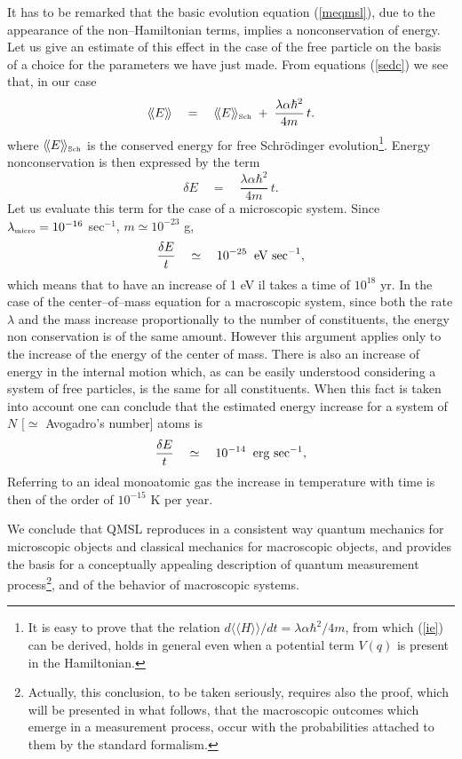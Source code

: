 \documentclass[10pt,a4paper]{article}
\newcommand{\llangle}{\langle\!\langle}
\newcommand{\rrangle}{\rangle\!\rangle}
\begin{document}
It has to be remarked that the basic evolution equation
(\ref{meqmsl}), due to the appearance of the non--Hamiltonian
terms, implies a nonconservation of energy. Let us give an
estimate of this effect in the case of the free particle on the
basis of a choice for the parameters we have just made. From
equations (\ref{sedc}) we see that, in our case
\begin{equation} \label{ie}
\llangle E \rrangle \quad = \quad \llangle E
\rrangle_{\makebox{\tiny Sch}} \; + \;
\frac{\lambda\alpha\hbar^{2}}{4m}\, t.
\end{equation}
where $\llangle E \rrangle_{\makebox{\tiny Sch}}$ is the conserved
energy for free Schr\"odinger evolution\footnote{It is easy to
prove that the relation $d\llangle H \rrangle/dt = \lambda \alpha
\hbar^{2}/4m$, from which (\ref{ie}) can be derived, holds in
general even when a potential term $V(q)$ is present in the
Hamiltonian.}. Energy nonconservation is then expressed by the
term
\begin{equation}
\delta E \quad = \quad \frac{\lambda\alpha\hbar^{2}}{4m}\, t.
\end{equation}
Let us evaluate this term for the case of a microscopic system.
Since $\lambda_{\makebox{\tiny micro}} = 10^{-16}$ sec$^{-1}$, $m
\simeq 10^{-23}$ g,
\begin{equation}
\frac{\delta E}{t} \quad \simeq \quad 10^{-25} \;\; \makebox{eV
sec}^{-1},
\end{equation}
which means that to have an increase of 1 eV il takes a time of
$10^{18}$ yr. In the case of the center--of--mass equation for a
macroscopic system, since both the rate $\lambda$ and the mass
increase proportionally to the number of constituents, the energy
non conservation is of the same amount. However this argument
applies only to the increase of the energy of the center of mass.
There is also an increase of energy in the internal motion which,
as can be easily understood considering a system of free
particles, is the same for all constituents. When this fact is
taken into account one can conclude that the estimated energy
increase for a system of $N$  $[\simeq$ Avogadro's number] atoms is
\begin{equation}
\frac{\delta E}{t} \quad \simeq \quad 10^{-14} \;\; \makebox{erg
sec}^{-1},
\end{equation}
Referring to an ideal monoatomic gas the increase in temperature
with time is then of the order of $10^{-15}$ K per year.

We conclude that QMSL reproduces in a consistent way quantum
mechanics for microscopic objects and classical mechanics for
macroscopic objects, and provides the basis for a conceptually
appealing description of quantum measurement
process\footnote{Actually, this conclusion, to be taken seriously,
requires also the proof, which will be presented in what follows,
that the macroscopic outcomes which emerge in a measurement
process, occur with the probabilities attached to them by the
standard formalism.}, and of the behavior of macroscopic systems.
\end{document}
